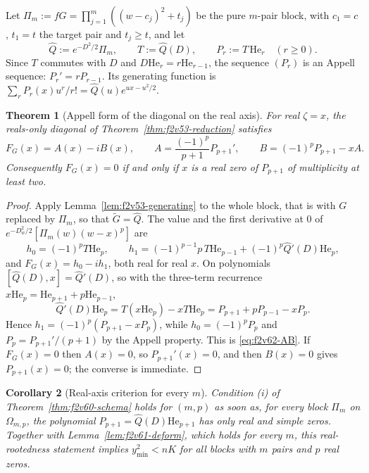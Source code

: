 \documentclass[11pt]{article}
\newtheorem{theorem}{Theorem}[section]
\newtheorem{corollary}[theorem]{Corollary}
\theoremstyle{definition}
\theoremstyle{remark}
\begin{document}
Let \(\Pi_m:=fG=\prod_{j=1}^m((w-c_j)^2+t_j)\) be the pure \(m\)-pair
block, with \(c_1=c\), \(t_1=t\) the target pair and \(t_j\ge t\), and
let
\begin{equation}
 \widehat Q:=e^{-D^2/2}\Pi_m,\qquad T:=\widehat Q(D),\qquad
 P_r:=T\,\mathrm{He}_r\quad(r\ge0).
 \label{eq:f2v62-T}
\end{equation}
Since \(T\) commutes with \(D\) and \(D\mathrm{He}_r=r\mathrm{He}_{r-1}\),
the sequence \((P_r)\) is an Appell sequence: \(P_r'=rP_{r-1}\).  Its
generating function is \(\sum_rP_r(x)u^r/r!=\widehat Q(u)e^{ux-u^2/2}\).

\begin{theorem}[Appell form of the diagonal on the real axis]
\label{thm:f2v62-appell}
For real \(\zeta=x\), the reals-only diagonal of
Theorem~\ref{thm:f2v53-reduction} satisfies
\begin{equation}
 F_G(x)=A(x)-iB(x),\qquad
 A=\frac{(-1)^p}{p+1}P_{p+1}',\qquad
 B=(-1)^pP_{p+1}-xA .
 \label{eq:f2v62-AB}
\end{equation}
Consequently \(F_G(x)=0\) if and only if \(x\) is a real zero of
\(P_{p+1}\) of multiplicity at least two.
\end{theorem}

\begin{proof}
Apply Lemma~\ref{lem:f2v53-generating} to the whole block, that is with
\(G\) replaced by \(\Pi_m\), so that \(\widetilde G=\widehat Q\).  The
value and the first derivative at \(0\) of
\(e^{-D_w^2/2}[\Pi_m(w)(w-x)^p]\) are
\[
 h_0=(-1)^pT\mathrm{He}_p,\qquad
 h_1=(-1)^{p-1}p\,T\mathrm{He}_{p-1}+(-1)^p\widehat Q'(D)\mathrm{He}_p,
\]
and \(F_G(x)=h_0-ih_1\), both real for real \(x\).  On polynomials
\([\widehat Q(D),x]=\widehat Q'(D)\), so with the three-term recurrence
\(x\mathrm{He}_p=\mathrm{He}_{p+1}+p\mathrm{He}_{p-1}\),
\[
 \widehat Q'(D)\mathrm{He}_p=T(x\mathrm{He}_p)-xT\mathrm{He}_p
 =P_{p+1}+pP_{p-1}-xP_p .
\]
Hence \(h_1=(-1)^p(P_{p+1}-xP_p)\), while \(h_0=(-1)^pP_p\) and
\(P_p=P_{p+1}'/(p+1)\) by the Appell property.  This is
\eqref{eq:f2v62-AB}.  If \(F_G(x)=0\) then \(A(x)=0\), so
\(P_{p+1}'(x)=0\), and then \(B(x)=0\) gives \(P_{p+1}(x)=0\); the
converse is immediate.
\end{proof}

\begin{corollary}[Real-axis criterion for every \(m\)]
\label{cor:f2v62-criterion}
Condition (i) of Theorem~\ref{thm:f2v60-schema} holds for \((m,p)\) as
soon as, for every block \(\Pi_m\) on \(\Omega_{m,p}\), the polynomial
\(P_{p+1}=\widehat Q(D)\mathrm{He}_{p+1}\) has only real and simple zeros.
Together with Lemma~\ref{lem:f2v61-deform}, which holds for every
\(m\), this real-rootedness statement implies
\(y_{\min}^2<nK\) for all blocks with \(m\) pairs and \(p\) real
zeros.
\end{corollary}
\end{document}
